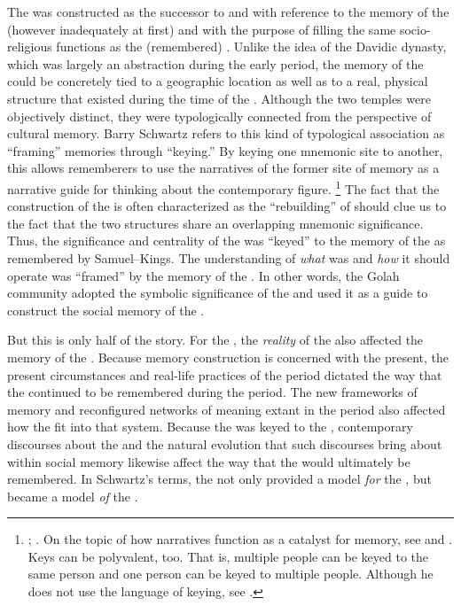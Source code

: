 The \secondtemple was constructed as the successor to and with reference to the memory of the \firsttemple (however inadequately at first) and with the purpose of filling the same socio-religious functions as the (remembered) \firsttemple. Unlike the idea of the Davidic dynasty, which was largely an abstraction during the early \secondtemple period, the memory of the \firsttemple could be concretely tied to a geographic location as well as to a real, physical structure that existed during the time of the \chronicler. Although the two temples were objectively distinct, they were typologically connected from the perspective of cultural memory. Barry Schwartz refers to this kind of typological association as ``framing'' memories through ``keying.'' By keying one mnemonic site to another, this allows rememberers to use the narratives of the former site of memory as a narrative guide for thinking about the contemporary figure.%
    \footnote{\Cite{schwartz_asr1996}; \cite{thatcher_thatcher2014}. On the topic of how narratives function as a catalyst for memory, see \cite{wertsch_sr2008} and \cite{wertsch_wagoner2017}. Keys can be polyvalent, too. That is, multiple people can be keyed to the same person and one person can be keyed to multiple people. Although he does not use the language of keying, see \cite{youngberg_jhs2017}.}
The fact that the construction of the \secondtemple is often characterized as the ``rebuilding'' of \thetemple should clue us to the fact that the two structures share an overlapping mnemonic significance. Thus, the significance and centrality of the \secondtemple was ``keyed'' to the memory of the \firsttemple as remembered by Samuel--Kings. The understanding of \emph{what} \thetemple was and \emph{how} it should operate was ``framed'' by the memory of the \firsttemple. In other words, the Golah community adopted the symbolic significance of the \firsttemple and used it as a guide to construct the social memory of the \secondtemple.

But this is only half of the story. For the \chronicler, the \emph{reality} of the \secondtemple also affected the memory of the \firsttemple. Because memory construction is concerned with the present, the present circumstances and real-life practices of the \secondtemple period dictated the way that the \firsttemple continued to be remembered during the \secondtemple period. The new frameworks of memory and reconfigured networks of meaning extant in the \secondtemple period also affected how the \firsttemple fit into that system. Because the \secondtemple was keyed to the \firsttemple, contemporary discourses about the \secondtemple and the natural evolution that such discourses bring about within social memory likewise affect the way that the \firsttemple would ultimately be remembered. In Schwartz's terms, the \firsttemple not only provided a model \emph{for} the \secondtemple, but became a model \emph{of} the \secondtemple.
    \autocite[18]{schwartz2000}

